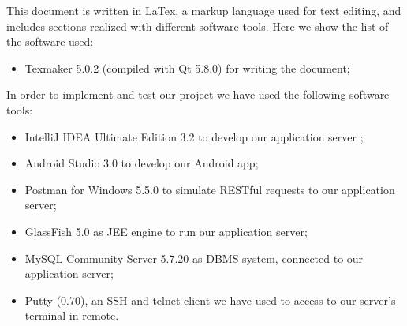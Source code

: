 This document is written in LaTex, a markup language used for text editing, and includes sections realized with different software tools. Here we show the list of the software used:
\begin{itemize}
	\item Texmaker 5.0.2 (compiled with Qt 5.8.0) for writing the document;
\end{itemize}
In order to implement and test our project we have used the following software tools:
\begin{itemize}
	\item IntelliJ IDEA Ultimate Edition 3.2 to develop our application server ;
	\item Android Studio 3.0 to develop our Android app;
	\item Postman for Windows 5.5.0 to simulate RESTful requests to our application server;
	\item GlassFish 5.0 as JEE engine to run our application server;
	\item MySQL Community Server 5.7.20 as DBMS system, connected to our application server;
	\item Putty (0.70), an SSH and telnet client we have used to access to our server's terminal in remote.
\end{itemize}